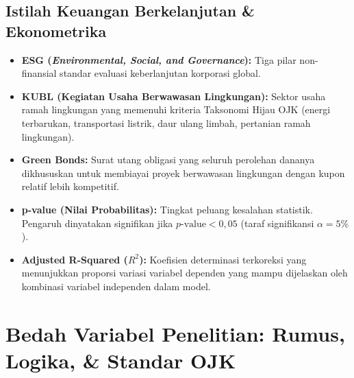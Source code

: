 \documentclass[11pt,a4paper]{article}
\begin{document}
\subsection{Istilah Keuangan Berkelanjutan \& Ekonometrika}
\begin{itemize}
    \item \textbf{ESG (\textit{Environmental, Social, and Governance}):} Tiga pilar non-finansial standar evaluasi keberlanjutan korporasi global.
    \item \textbf{KUBL (Kegiatan Usaha Berwawasan Lingkungan):} Sektor usaha ramah lingkungan yang memenuhi kriteria Taksonomi Hijau OJK (energi terbarukan, transportasi listrik, daur ulang limbah, pertanian ramah lingkungan).
    \item \textbf{Green Bonds:} Surat utang obligasi yang seluruh perolehan dananya dikhususkan untuk membiayai proyek berwawasan lingkungan dengan kupon relatif lebih kompetitif.
    \item \textbf{p-value (Nilai Probabilitas):} Tingkat peluang kesalahan statistik. Pengaruh dinyatakan signifikan jika $p\text{-value} < 0{,}05$ (taraf signifikansi $\alpha = 5\%$).
    \item \textbf{Adjusted R-Squared ($R^2$):} Koefisien determinasi terkoreksi yang menunjukkan proporsi variasi variabel dependen yang mampu dijelaskan oleh kombinasi variabel independen dalam model.
\end{itemize}

\section{Bedah Variabel Penelitian: Rumus, Logika, \& Standar OJK}
\end{document}
